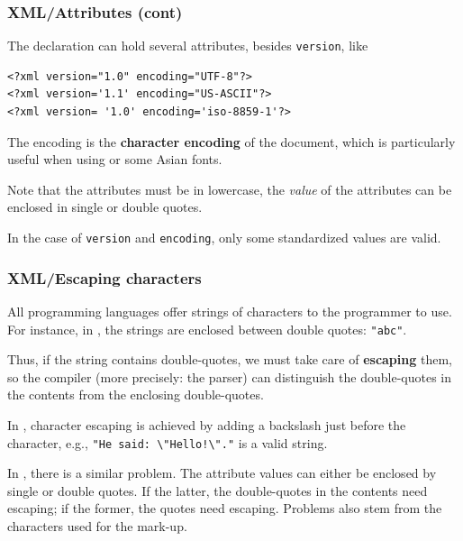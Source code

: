 %
\begin{frame}[containsverbatim]
\frametitle{XML/Attributes (cont)}

The declaration can hold several attributes, besides
\verb|version|, like
\begin{verbatim}
<?xml version="1.0" encoding="UTF-8"?>
<?xml version='1.1' encoding="US-ASCII"?>
<?xml version= '1.0' encoding='iso-8859-1'?>
\end{verbatim}
The encoding is the \textbf{character encoding} of the \XML document,
which is particularly useful when using \Unicode or some Asian
fonts.

\bigskip

Note that the attributes must be in lowercase, the \emph{value} of the
attributes can be enclosed in single or double quotes.

\bigskip

In the case of \verb|version| and \verb|encoding|, only some
standardized values are valid.

\end{frame}

%
\begin{frame}[containsverbatim]
\frametitle{XML/Escaping characters}

All programming languages offer strings of characters to the
programmer to use. For instance, in \Clang, the strings are enclosed
between double quotes: \verb|"abc"|.

\bigskip

Thus, if the string contains double-quotes, we must take care of
\textbf{escaping} them, so the compiler (more precisely: the parser)
can distinguish the double-quotes in the contents from the enclosing
double-quotes.

\bigskip

In \Clang, character escaping is achieved by adding a backslash just
before the character, e.g., \verb|"He said: \"Hello!\"."| is a valid
\Clang string.

\bigskip

In \XML, there is a similar problem. The attribute values can either
be enclosed by single or double quotes. If the latter, the
double-quotes in the contents need escaping; if the former, the quotes
need escaping. Problems also stem from the characters used for the
mark-up.

\end{frame}

